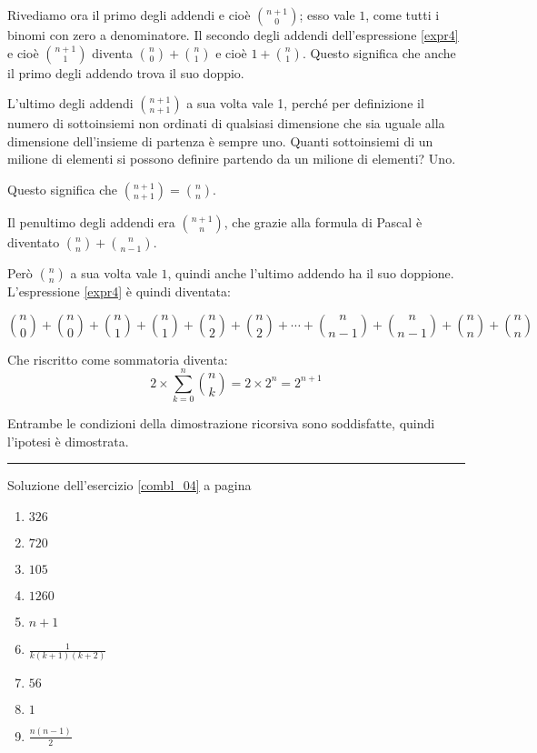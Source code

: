 Rivediamo ora il primo degli addendi e cioè ${n+1 \choose 0}$; esso vale $1$, come tutti i binomi con zero a denominatore.
Il secondo degli addendi dell'espressione \ref{expr4} e cioè ${n+1\choose 1}$ diventa ${n\choose 0}+{n\choose 1}$ e cioè $1+{n\choose 1}$.  Questo significa che anche il primo degli addendo trova il suo doppio.

L'ultimo degli addendi ${n+1\choose n+1}$ a sua volta vale 1, perché per definizione il numero di sottoinsiemi non ordinati di qualsiasi dimensione che sia uguale alla dimensione dell'insieme di partenza è sempre uno.  Quanti sottoinsiemi di un milione di elementi si possono definire partendo da un milione di elementi?  Uno.

Questo significa che ${n+1\choose n+1}={n\choose n}$.

Il penultimo degli addendi era ${n+1\choose n}$, che grazie alla formula di Pascal è diventato ${n\choose n}+{n\choose n-1}$.

Però ${n\choose n}$ a sua volta vale $1$, quindi anche l'ultimo addendo ha il suo doppione.  L'espressione \ref{expr4} è quindi diventata:

\[
{n\choose 0}+{n\choose 0}+
{n\choose 1}+{n\choose 1}+
{n\choose 2}+{n\choose 2}+\cdots+
{n\choose n-1}+{n\choose n-1}+
{n\choose n}+{n\choose n}
\]

Che riscritto come sommatoria diventa:
\[
2\times\sum_{k=0}^n{{n\choose k}} = 2\times2^n=2^{n+1}
\]

Entrambe le condizioni della dimostrazione ricorsiva sono soddisfatte, quindi l'ipotesi è dimostrata.

\vspace{1cm}
\hrule
\vspace{1cm}

Soluzione dell'esercizio \ref{combl_04} a pagina \pageref{combl_04}\label{combs_04}

\begin{enumerate}[label=(\alph*)]
\item $326$
\item $720$
\item $105$
\item $1260$
\item $n+1$
\item $\frac{1}{k(k+1)(k+2)}$
\item $56$
\item $1$
\item $\frac{n(n-1)}{2}$
\end{enumerate}


